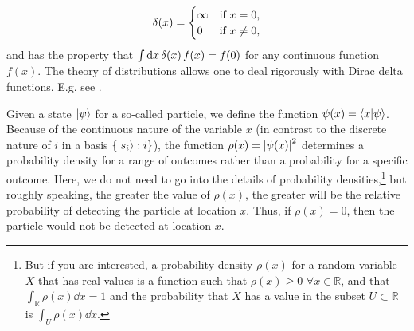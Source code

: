 {\begin{equation}
    \var(x)=
    \begin{cases} \infty & \text{if $x=0$,} \\
    0 & \text{if $x\neq 0$},
    \end{cases}
    \end{equation} and has the property that 
    $\int \dd x \var(x) f(x) = f(0)$ for any continuous function $f(x)$. The theory of distributions allows one to deal rigorously with Dirac delta functions. E.g. see \cite[ch. 6]{Rudin}.  
    }
    
     Given a state $\ket{\psi}$ for a so-called particle, we define the function $\psi(x)=\ip{x}{\psi}$. Because of the continuous nature of the variable $x$ (in contrast to the discrete nature of $i$ in a basis $\{\ket{s_i}:i\}$), the function $\rho(x)=\abs{\psi(x)}^2\label{rhodensity}$ determines a probability density for a range of outcomes rather than a probability for a specific outcome. Here, we do not need to go into the details of probability densities,\footnote{But if you are interested, a probability density $\rho(x)$ for a random variable $X$ that has real values is a function such that $\rho(x)\geq 0\, \,\forall x\in\mathbb{R}$, and that $\int_\mathbb{R} \rho(x) \dd x =1$ and the probability that $X$ has a value in the subset $U\subset\mathbb{R}$ is $\int_U \rho(x) \dd x $. } but roughly speaking, the greater the value of $\rho(x)$, the greater will be the relative probability of detecting the particle at location $x$. Thus, if $\rho(x)=0$, then the particle would not be detected at location $x$. 
    
